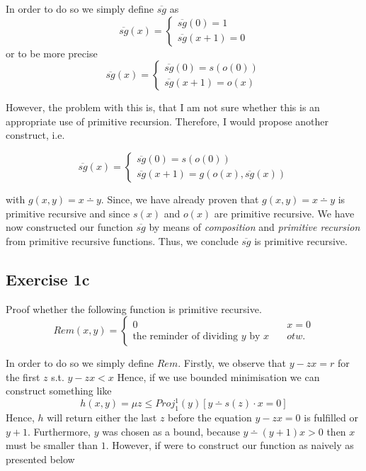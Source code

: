 \documentclass[11pt,a4paper]{article}
\begin{document}
In order to do so we simply define $\overline{sg}$ as
\begin{equation*}
\overline{sg}(x)=
\begin{cases}
   \overline{sg}(0) = 1        \\
  \overline{sg}(x+1)= 0  
 \end{cases}
\end{equation*}
 or to be more precise  
\begin{equation*}
\overline{sg}(x)=
\begin{cases}
   \overline{sg}(0) = s(o(0))         \\
   \overline{sg}(x+1)=  o(x) 
 \end{cases}
\end{equation*}

However, the problem with this is, that I am not sure whether this is an appropriate use of primitive recursion.
Therefore, I would propose another construct, i.e.

\begin{equation*}
\overline{sg}(x)=
\begin{cases}
   \overline{sg}(0) = s(o(0))         \\
   \overline{sg}(x+1)=  g(o(x) ,\overline{sg}(x))
 \end{cases}
\end{equation*}

with $g(x,y)=x \dotminus y$.
Since, we have already proven that $g(x,y)=x \dotminus y$ is primitive recursive and 
since  $s(x)$ and $o(x)$ are primitive recursive. We have now constructed our function 
$\overline{sg}$ by means of \emph{composition} and \emph{primitive recursion} from primitive recursive functions.
Thus, we conclude $\overline{sg}$ is primitive recursive.




\subsection*{Exercise 1c}
Proof whether the following function is primitive recursive.
\begin{equation*}
Rem(x,y)=
\begin{cases}
    0  & \quad   x=0  \\
    \text{the reminder of dividing } y \text{ by } x    & \quad otw.
\end{cases}
\end{equation*}


\bigbreak

In order to do so we simply define $Rem$. 
Firstly, we observe that $y-zx=r$ for the first $z$ s.t. $y-zx<x$
Hence, if we use bounded minimisation we can construct something like
\begin{equation*}
h(x,y)= \mu z \leq Proj_{1}^{1}(y) [y \dotminus s(z) \cdot x = 0]
\end{equation*}
Hence, $h$ will return either the last $z$ before the equation $y-zx=0$ is fulfilled or $y+1$.
Furthermore, $y$ was chosen as a bound, because $y \dotminus (y+1)x > 0$ then $x$ must be smaller than $1$.
However, if were to construct our function as naively as presented below
\end{document}
